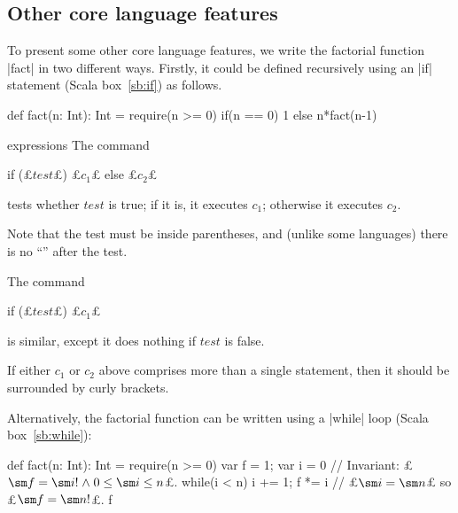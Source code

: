 
\subsection*{Other core language features}

To present some other core language features, we write the factorial function
|fact| in two different ways.  Firstly, it could be defined recursively using
an |if| statement (Scala box~\ref{sb:if}) as follows.
%
\begin{scala}
  def fact(n: Int): Int = {
    require(n >= 0)
    if(n == 0) 1 else n*fact(n-1)
  }
\end{scala}


\begin{scalaBox}{ expressions}  
\label{sb:if}
The command
\begin{scala}
  if (£$test$£) £$c_1$£ else £$c_2$£
\end{scala}
tests whether $test$ is true; if it is, it executes $c_1$; otherwise it
executes $c_2$.

Note that the test must be inside parentheses, and (unlike some languages)
there is no ``'' after the test.

The command
\begin{scala}
  if (£$test$£) £$c_1$£
\end{scala}
is similar, except it does nothing if $test$ is false.

If either $c_1$ or $c_2$ above comprises more than a single statement, then it
should be surrounded by curly brackets.
\end{scalaBox}


\begin{mysamepage}
Alternatively, the factorial function can be written using a |while| loop
(Scala box~\ref{sb:while}):
%
\begin{scala}
  def fact(n: Int): Int = {
    require(n >= 0)
    var f = 1; var i = 0 // Invariant: £$\sm f = \sm i! \land 0 \le \sm i \le n$£.
    while(i < n){ i += 1; f *= i }
    // £$\sm i = \sm n$£ so £$\sm f = \sm n!$£.
    f
  }
\end{scala}
\end{mysamepage}


